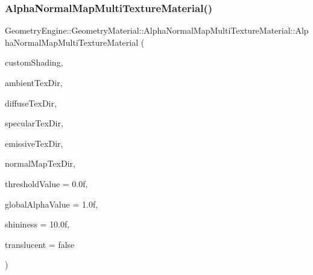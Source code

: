 \subsubsection{\texorpdfstring{AlphaNormalMapMultiTextureMaterial()}{AlphaNormalMapMultiTextureMaterial()}\hspace{0.1cm}{\footnotesize\ttfamily [1/2]}}
{\footnotesize\ttfamily Geometry\+Engine\+::\+Geometry\+Material\+::\+Alpha\+Normal\+Map\+Multi\+Texture\+Material\+::\+Alpha\+Normal\+Map\+Multi\+Texture\+Material (\begin{DoxyParamCaption}\item[{const \mbox{\hyperlink{class_geometry_engine_1_1_custom_shading_1_1_custom_shading_interface}{Custom\+Shading\+::\+Custom\+Shading\+Interface}} $\ast$const}]{custom\+Shading,  }\item[{const std\+::string \&}]{ambient\+Tex\+Dir,  }\item[{const std\+::string \&}]{diffuse\+Tex\+Dir,  }\item[{const std\+::string \&}]{specular\+Tex\+Dir,  }\item[{const std\+::string \&}]{emissive\+Tex\+Dir,  }\item[{const std\+::string \&}]{normal\+Map\+Tex\+Dir,  }\item[{float}]{threshold\+Value = {\ttfamily 0.0f},  }\item[{float}]{global\+Alpha\+Value = {\ttfamily 1.0f},  }\item[{float}]{shininess = {\ttfamily 10.0f},  }\item[{bool}]{translucent = {\ttfamily false} }\end{DoxyParamCaption})}

